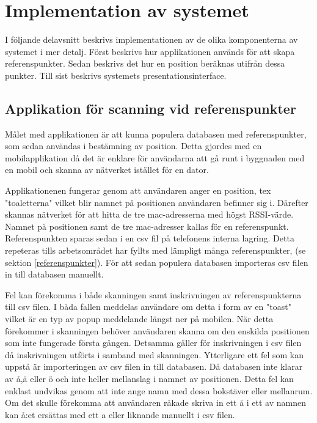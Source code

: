 \documentclass[swedish, a4paper,12pt]{article}
\begin{document}
\section{Implementation av systemet}
I följande delavsnitt beskrivs implementationen av de olika komponenterna av systemet i mer detalj. Först beskrivs hur applikationen används för att skapa referenspunkter. Sedan beskrivs det hur en position beräknas utifrån dessa punkter. Till sist beskrivs systemets presentationsinterface.

\subsection{Applikation för scanning vid referenspunkter}
Målet med applikationen är att kunna populera databasen med referenspunkter, som sedan användas i bestämning av position. Detta gjordes med en mobilapplikation då det är enklare för användarna att gå runt i byggnaden med en mobil och skanna av nätverket istället för en dator.

Applikationenen fungerar genom att användaren anger en position, tex "toaletterna" vilket blir namnet på positionen användaren befinner sig i. Därefter skannas nätverket för att hitta de tre mac-adresserna med högst RSSI-värde. Namnet på positionen samt de tre mac-adresser kallas för en referenspunkt. Referenspunkten sparas sedan i en csv fil på telefonens interna lagring. Detta repeteras tills arbetsområdet har fyllts med lämpligt många referenspunkter, (se sektion \ref{referenspunkter}). För att sedan populera databasen importeras csv filen in till databasen manuellt.

Fel kan förekomma i både skanningen samt inskrivningen av referenspunkterna till csv filen. I båda fallen meddelas användare om detta i form av en "toast" vilket är en typ av popup meddelande längst ner på mobilen. När detta förekommer i skanningen behöver användaren skanna om den enskilda positionen som inte fungerade första gången. Detsamma gäller för inskrivningen i csv filen då inskrivningen utförts i samband med skanningen. Ytterligare ett fel som kan uppstå är importeringen av csv filen in till databasen. Då databasen inte klarar av å,ä eller ö och inte heller mellanslag i namnet av positionen. Detta fel kan enklast undvikas genom att inte ange namn med dessa bokstäver eller mellanrum. Om det skulle förekomma att användaren råkade skriva in ett å i ett av namnen kan å:et ersättas med ett a eller liknande manuellt i csv filen.%
\end{document}
